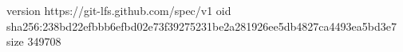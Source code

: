 version https://git-lfs.github.com/spec/v1
oid sha256:238bd22efbbb6efbd02e73f39275231be2a281926ee5db4827ca4493ea5bd3e7
size 349708

